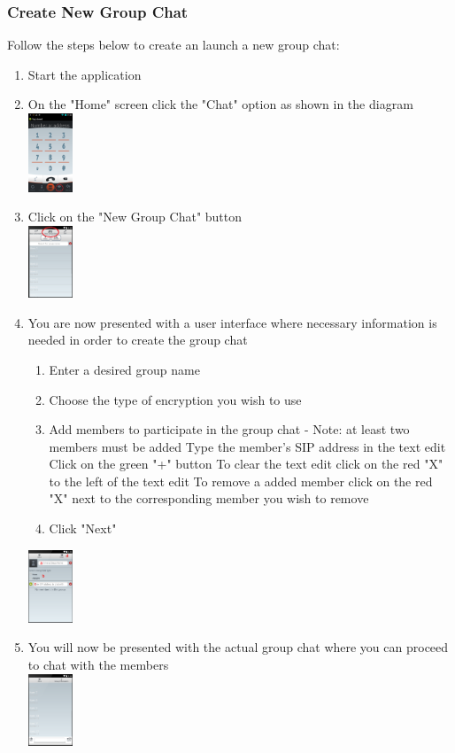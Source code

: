 \documentclass[11pt]{article}
\begin{document}
\subsubsection*{Create New Group Chat}
Follow the steps below to create an launch a new group chat:
\begin{enumerate}
\item Start the application
\item On the "Home" screen click the "Chat" option as shown in the diagram\\
\includegraphics[width=50px]{images/mainScreen.png}
\item Click on the "New Group Chat" button\\
\includegraphics[width=50px]{images/ChatlistCG.png}
\item You are now presented with a user interface where necessary information is needed in order to create the group chat
\begin{enumerate}
\item Enter a desired group name
\item Choose the type of encryption you wish to use
\item Add members to participate in the group chat - Note: at least two members must be added
\subitem Type the member's SIP address in the text edit
\subitem Click on the green "+" button
\subitem To clear the text edit click on the red "X" to the left of the text edit
\subitem To remove a added member click on the red "X" next to the corresponding member you wish to remove
\item Click "Next"
\end{enumerate}
\includegraphics[width=50px]{images/GroupChatCreation.png}
\item You will now be presented with the actual group chat where you can proceed to chat with the members\\
\includegraphics[width=50px]{images/groupchat.png}
\end{enumerate}
\end{document}
